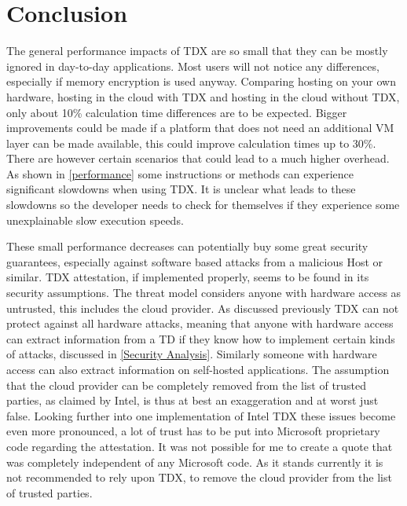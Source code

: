 
\chapter{Conclusion}
\label{ch:Conclusion}

The general performance impacts of TDX are so small that they can be mostly ignored in day-to-day applications. Most users will not notice any differences, especially if memory encryption is used anyway. Comparing hosting on your own hardware, hosting in the cloud with TDX and hosting in the cloud without TDX, only about 10\% calculation time differences are to be expected. Bigger improvements could be made if a platform that does not need an additional VM layer can be made available, this could improve calculation times up to 30\%. There are however certain scenarios that could lead to a much higher overhead. As shown in \cref{performance} some instructions or methods can experience significant slowdowns when using TDX. It is unclear what leads to these slowdowns so the developer needs to check for themselves if they experience some unexplainable slow execution speeds.

These small performance decreases can potentially buy some great security guarantees, especially against software based attacks from a malicious Host or similar. TDX attestation, if implemented properly, seems to be found in its security assumptions. The threat model considers anyone with hardware access as untrusted, this includes the cloud provider. As discussed previously TDX can not protect against all hardware attacks, meaning that anyone with hardware access can extract information from a TD if they know how to implement certain kinds of attacks, discussed in \cref{Security Analysis}. Similarly someone with hardware access can also extract information on self-hosted applications. The assumption that the cloud provider can be completely removed from the list of trusted parties, as claimed by Intel, is thus at best an exaggeration and at worst just false. Looking further into one implementation of Intel TDX these issues become even more pronounced, a lot of trust has to be put into Microsoft proprietary code regarding the attestation. It was not possible for me to create a quote that was completely independent of any Microsoft code. As it stands currently it is not recommended to rely upon TDX, to remove the cloud provider from the list of trusted parties.


